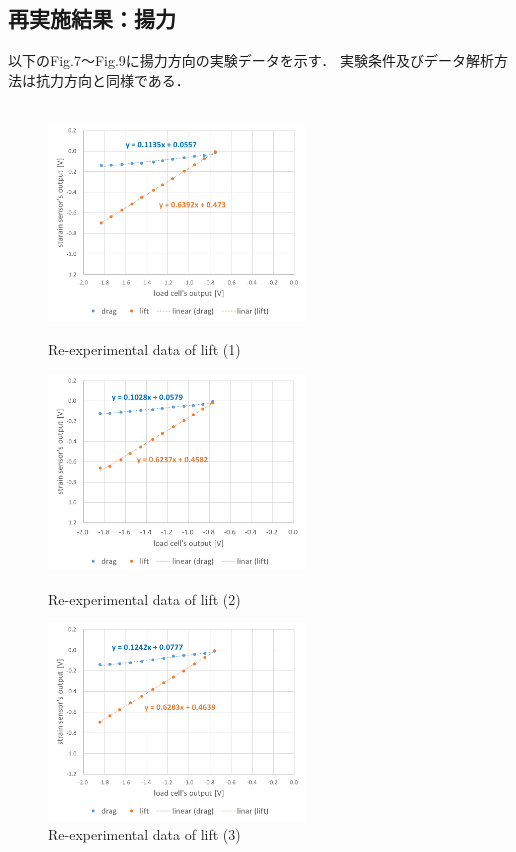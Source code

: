 \documentclass[twocolumn,a4j]{jsarticle}
\begin{document}
\newpage

\subsection{再実施結果：揚力}
以下のFig.7～Fig.9に揚力方向の実験データを示す．
実験条件及びデータ解析方法は抗力方向と同様である．\\ \\
\begin{figure}[htbp]
    \footnotesize
    \begin{center}
        \includegraphics[width=68mm]{../images/graph_21119_lift_1.png}
        \caption{Re-experimental data of lift (1)}
        \includegraphics[width=68mm]{../images/graph_21119_lift_2.png}
        \caption{Re-experimental data of lift (2)}
        \includegraphics[width=68mm]{../images/graph_21119_lift_3.png}
        \caption{Re-experimental data of lift (3)}
    \end{center}
\end{figure}
\end{document}

